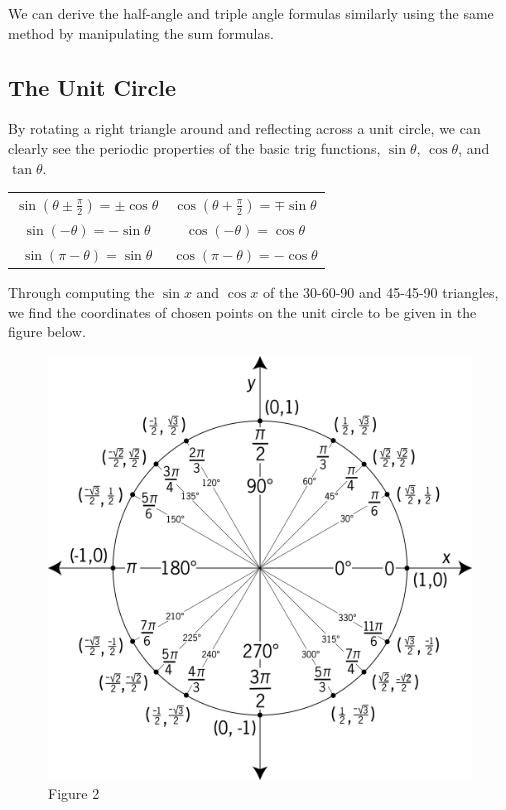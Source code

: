 \documentclass{article}
\begin{document}
            \noindent We can derive the half-angle and triple angle formulas similarly using the
            same method by manipulating the sum formulas.

        \subsection{The Unit Circle}
            By rotating a right triangle around and reflecting across a unit circle, we can clearly
            see the periodic properties of the basic trig functions, $\sin\theta$, $\cos\theta$,
            and $\tan\theta$.

            \begin{center}
                \begin{tabular}{cc}
                    $\sin(\theta \pm \frac{\pi}{2})=\pm\cos\theta$
                    & $\cos(\theta+\frac{\pi}{2})=\mp\sin\theta$ \\
                    $\sin(-\theta)=-\sin\theta$
                    & $\cos(-\theta)=\cos\theta$ \\
                    $\sin(\pi-\theta)=\sin\theta$
                    & $\cos(\pi-\theta)=-\cos\theta$
                \end{tabular}
            \end{center}

            \noindent Through computing the $\sin x$ and $\cos x$ of the 30-60-90 and 45-45-90
            triangles, we find the coordinates of chosen points on the unit circle to be given in
            the figure below.

            \begin{figure}[h]
                \centering
                \includegraphics[scale = 0.2] {Resources/Unit2Trig/unit_circle.png}
                \caption*{Figure 2}
            \end{figure}
\end{document}
